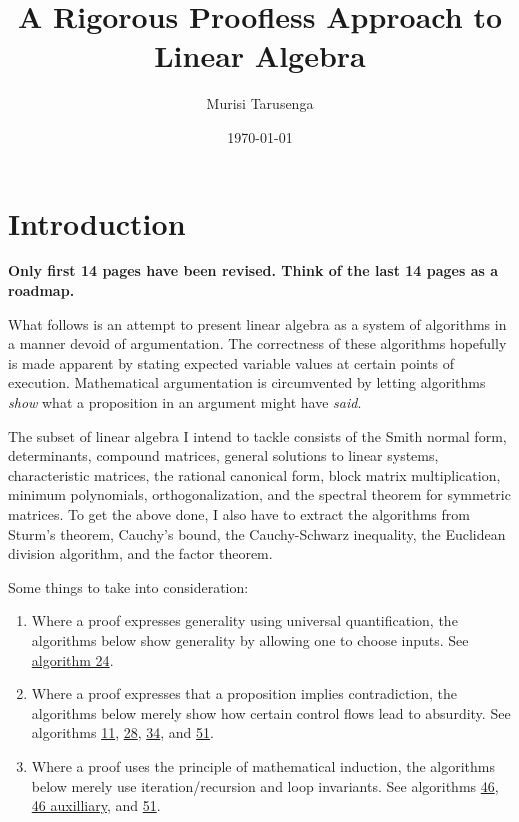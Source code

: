 \documentclass[twocolumn]{article}
\begin{document}
	\title{A Rigorous Proofless Approach to Linear Algebra}
	\author{Murisi Tarusenga}
	\date{\today{} \currenttime}
	\maketitle
	\section{Introduction}
		\textbf{Only first 14 pages have been revised. Think of the last 14 pages as a roadmap.}
		
		What follows is an attempt to present linear algebra as a system of algorithms in a manner devoid of argumentation. The correctness of these algorithms hopefully is made apparent by stating expected variable values at certain points of execution. Mathematical argumentation is circumvented by letting algorithms \textit{show} what a proposition in an argument might have \textit{said}.
		
		The subset of linear algebra I intend to tackle consists of the Smith normal form, determinants, compound matrices, general solutions to linear systems, characteristic matrices, the rational canonical form, block matrix multiplication, minimum polynomials, orthogonalization, and the spectral theorem for symmetric matrices. To get the above done, I also have to extract the algorithms from Sturm's theorem, Cauchy's bound, the Cauchy-Schwarz inequality, the Euclidean division algorithm, and the factor theorem.
		
		Some things to take into consideration:
		\begin{enumerate}
			\item Where a proof expresses generality using universal quantification, the algorithms below show generality by allowing one to choose inputs. See \hyperref[sec:algorithm 24]{algorithm 24}.
			\item Where a proof expresses that a proposition implies contradiction, the algorithms below merely show how certain control flows lead to absurdity. See algorithms \hyperref[sec:algorithm 11]{11}, \hyperref[sec:algorithm 28]{28}, \hyperref[sec:algorithm 35]{34}, and \hyperref[sec:algorithm 52]{51}.
			\item Where a proof uses the principle of mathematical induction, the algorithms below merely use iteration/recursion and loop invariants. See algorithms \hyperref[sec:algorithm 47]{46}, \hyperref[sec:algorithm 47]{46 auxilliary}, and \hyperref[sec:algorithm 52]{51}.
		\end{enumerate}
		
\end{document}
